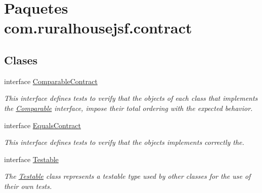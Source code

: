 \hypertarget{a00123}{}\section{Paquetes com.\+ruralhousejsf.\+contract}
\label{a00123}
\subsection*{Clases}
\begin{DoxyCompactItemize}
\item 
interface \mbox{\hyperlink{a00236}{Comparable\+Contract}}
\begin{DoxyCompactList}\small\item\em This interface defines tests to verify that the objects of each class that implements the \mbox{\hyperlink{}{Comparable}} interface, impose their total ordering with the expected behavior. \end{DoxyCompactList}\item 
interface \mbox{\hyperlink{a00240}{Equals\+Contract}}
\begin{DoxyCompactList}\small\item\em This interface defines tests to verify that the objects implements correctly the. \end{DoxyCompactList}\item 
interface \mbox{\hyperlink{a00244}{Testable}}
\begin{DoxyCompactList}\small\item\em The \mbox{\hyperlink{a00244}{Testable}} class represents a testable type used by other classes for the use of their own tests. \end{DoxyCompactList}\end{DoxyCompactItemize}
